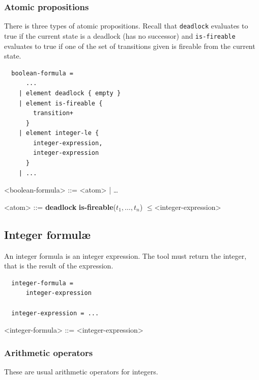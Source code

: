 \documentclass[10pt,english,a4paper]{article}
\newcommand\atomleq          {\boldmath$\leq$\xspace}
\newcommand\atomdead         {\textbf{deadlock}\xspace}
\newcommand\atomisfire[1]    {\textbf{is-fireable}(#1)}
\begin{document}
\subsubsection{Atomic propositions}

There is three types of atomic propositions.
Recall that
\lstinline!deadlock! evaluates to true if the current state is a deadlock
(has no successor) and
\lstinline!is-fireable! evaluates to true if one of the set of transitions
given is fireable from the current state.

\begin{multicols}{2}
\begin{lstlisting}
  boolean-formula =
      ...
    | element deadlock { empty }
    | element is-fireable {
        transition+
      }
    | element integer-le {
        integer-expression,
        integer-expression
      }
    | ...
\end{lstlisting}
\columnbreak
\setlength{\grammarindent}{6em}
\begin{grammar}
<boolean-formula> ::= <atom> | \ldots

<atom> ::= \atomdead
\alt \atomisfire{$t_1, \ldots, t_n$}
 \atomleq <integer-expression>
\end{grammar}
\end{multicols}


\subsection{Integer formul{\ae}}

An integer formula is an integer expression.
The tool must return the integer, that is the result of the expression.

\begin{multicols}{2}
\begin{lstlisting}
  integer-formula =
      integer-expression

  integer-expression = ...
\end{lstlisting}
\columnbreak
\begin{grammar}
<integer-formula> ::= <integer-expression>
\end{grammar}
\end{multicols}

\subsubsection{Arithmetic operators}

These are usual arithmetic operators for integers.
\end{document}

